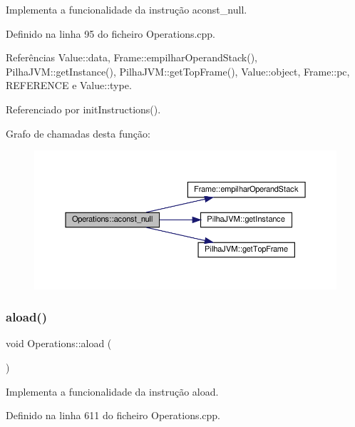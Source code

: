 Implementa a funcionalidade da instrução aconst\+\_\+null. 



Definido na linha 95 do ficheiro Operations.\+cpp.



Referências Value\+::data, Frame\+::empilhar\+Operand\+Stack(), Pilha\+J\+V\+M\+::get\+Instance(), Pilha\+J\+V\+M\+::get\+Top\+Frame(), Value\+::object, Frame\+::pc, R\+E\+F\+E\+R\+E\+N\+CE e Value\+::type.



Referenciado por init\+Instructions().

Grafo de chamadas desta função\+:\nopagebreak
\begin{figure}[H]
\begin{center}
\leavevmode
\includegraphics[width=350pt]{classOperations_af51ec8a98d9ed3167da0d8ac6279a1cd_cgraph}
\end{center}
\end{figure}
\mbox{\label{classOperations_a2f5c13146658e71de665c3b32ebed8c9}} 
\subsubsection{\texorpdfstring{aload()}{aload()}}
{\footnotesize\ttfamily void Operations\+::aload (\begin{DoxyParamCaption}{ }\end{DoxyParamCaption})\hspace{0.3cm}{\ttfamily [private]}}



Implementa a funcionalidade da instrução aload. 



Definido na linha 611 do ficheiro Operations.\+cpp.



